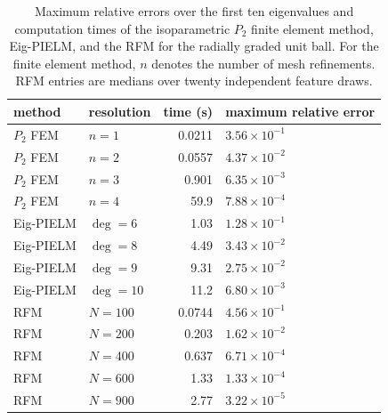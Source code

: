\begin{table}[!htbp]
\centering
\small
\setlength{\tabcolsep}{5pt}
\caption{Maximum relative errors over the first ten eigenvalues and computation times of the isoparametric \(P_2\) finite element method, Eig-PIELM, and the RFM for the radially graded unit ball. For the finite element method, \(n\) denotes the number of mesh refinements. RFM entries are medians over twenty independent feature draws.}
\label{tab:ball_benchmark_summary}
\begin{tabular}{llrl}
\toprule
method & resolution & time (s) & maximum relative error\\
\midrule
\(P_2\) FEM & \(n=1\) & 0.0211 & \(3.56\times 10^{-1}\)\\
\(P_2\) FEM & \(n=2\) & 0.0557 & \(4.37\times 10^{-2}\)\\
\(P_2\) FEM & \(n=3\) & 0.901 & \(6.35\times 10^{-3}\)\\
\(P_2\) FEM & \(n=4\) & 59.9 & \(7.88\times 10^{-4}\)\\
\midrule
Eig-PIELM & \(\deg=6\) & 1.03 & \(1.28\times 10^{-1}\)\\
Eig-PIELM & \(\deg=8\) & 4.49 & \(3.43\times 10^{-2}\)\\
Eig-PIELM & \(\deg=9\) & 9.31 & \(2.75\times 10^{-2}\)\\
Eig-PIELM & \(\deg=10\) & 11.2 & \(6.80\times 10^{-3}\)\\
\midrule
RFM & \(N=100\) & 0.0744 & \(4.56\times 10^{-1}\)\\
RFM & \(N=200\) & 0.203 & \(1.62\times 10^{-2}\)\\
RFM & \(N=400\) & 0.637 & \(6.71\times 10^{-4}\)\\
RFM & \(N=600\) & 1.33 & \(1.33\times 10^{-4}\)\\
RFM & \(N=900\) & 2.77 & \(3.22\times 10^{-5}\)\\
\bottomrule
\end{tabular}
\end{table}

